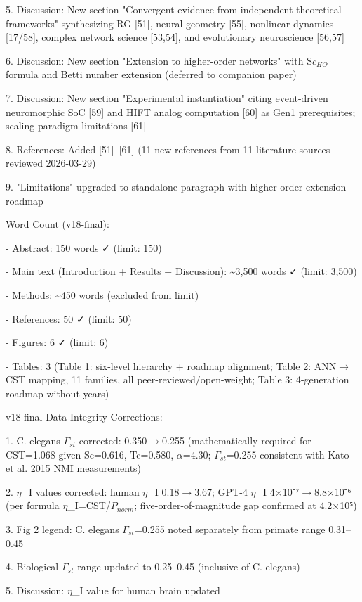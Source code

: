 \documentclass[a4paper,12pt]{article}
\begin{document}
5. Discussion: New section "Convergent evidence from independent theoretical frameworks" synthesizing RG [51], neural geometry [55], nonlinear dynamics [17/58], complex network science [53,54], and evolutionary neuroscience [56,57]

6. Discussion: New section "Extension to higher-order networks" with S$c_{HO}$ formula and Betti number extension (deferred to companion paper)

7. Discussion: New section "Experimental instantiation" citing event-driven neuromorphic SoC [59] and HIFT analog computation [60] as Gen1 prerequisites; scaling paradigm limitations [61]

8. References: Added [51]--[61] (11 new references from 11 literature sources reviewed 2026-03-29)

9. "Limitations" upgraded to standalone paragraph with higher-order extension roadmap

Word Count (v18-final):

- Abstract: 150 words ✓ (limit: 150)

- Main text (Introduction + Results + Discussion): \textasciitilde{}3,500 words ✓ (limit: 3,500)

- Methods: \textasciitilde{}450 words (excluded from limit)

- References: 50 ✓ (limit: 50)

- Figures: 6 ✓ (limit: 6)

- Tables: 3 (Table 1: six-level hierarchy + roadmap alignment; Table 2: ANN$\rightarrow$CST mapping, 11 families, all peer-reviewed/open-weight; Table 3: 4-generation roadmap without years)

v18-final Data Integrity Corrections:

1. C. elegans $\Gamma_{st}$ corrected: 0.350$\rightarrow$0.255 (mathematically required for CST=1.068 given Sc=0.616, Tc=0.580, $\alpha$=4.30; $\Gamma_{st}$=0.255 consistent with Kato et al. 2015 NMI measurements)

2. $\eta$_I values corrected: human $\eta$_I 0.18$\rightarrow$3.67; GPT-4 $\eta$_I 4$\times$10⁻⁷$\rightarrow$8.8$\times$10⁻⁶ (per formula $\eta$_I=CST/$P_{norm}$; five-order-of-magnitude gap confirmed at 4.2$\times$10⁵)

3. Fig 2 legend: C. elegans $\Gamma_{st}$=0.255 noted separately from primate range 0.31--0.45

4. Biological $\Gamma_{st}$ range updated to 0.25--0.45 (inclusive of C. elegans)

5. Discussion: $\eta$_I value for human brain updated
\end{document}
